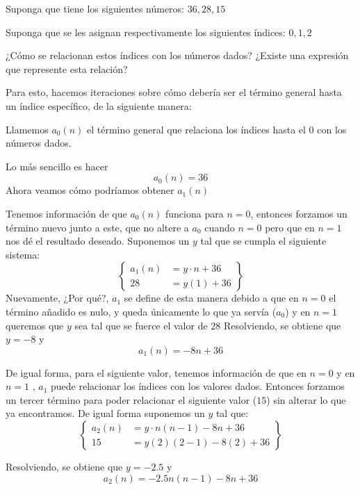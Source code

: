 Suponga que tiene los siguientes números: $36, 28, 15$

Suponga que se les asignan respectivamente los siguientes índices: $0, 1, 2$

¿Cómo se relacionan estos índices con los números dados?
¿Existe una expresión que represente esta relación?

Para esto, hacemos iteraciones sobre cómo debería ser el término general hasta un índice específico, de la siguiente manera:

Llamemos $a_0(n)$ el término general que relaciona los índices hasta el $0$ con los números dados.

Lo más sencillo es hacer
\[a_0(n) = 36\]
Ahora veamos cómo podríamos obtener $a_1(n)$

Tenemos información de que $a_0(n)$ funciona para $n = 0$, entonces forzamos un término nuevo junto a este, que no altere a $a_0$ cuando $n=0$ pero que en $n=1$ nos dé el resultado deseado.
Suponemos un $y$ tal que se cumpla el siguiente sistema:
\begin{equation*}
    \left\{
        \begin{aligned}
            a_1(n) &= y\cdot n + 36\\
            28 &= y(1) + 36
        \end{aligned}
    \right\}
\end{equation*}
Nuevamente, ¿Por qué?, $a_1$ se define de esta manera debido a que en $n=0$ el término añadido es nulo, y queda únicamente lo que ya servía ($a_0$) y en $n=1$ queremos que $y$ sea tal que se fuerce el valor de $28$
Resolviendo, se obtiene que $y = -8$ y
\[a_1(n) = -8n + 36\]

De igual forma, para el siguiente valor, tenemos información de que en $n=0$ y en $n=1$ , $a_1$ puede relacionar los índices con los valores dados. Entonces forzamos un tercer término para poder relacionar el siguiente valor ($15$) sin alterar lo que ya encontramos. De igual forma suponemos un $y$ tal que:
\begin{equation*}
    \left\{
        \begin{aligned}
            a_2(n) &= y\cdot n(n-1) -8n + 36\\
            15 &= y (2)(2-1) - 8(2) + 36
        \end{aligned}
    \right\}
\end{equation*}

Resolviendo, se obtiene que $y = -2.5$ y
\[a_2(n) = -2.5n(n-1) - 8n + 36\]